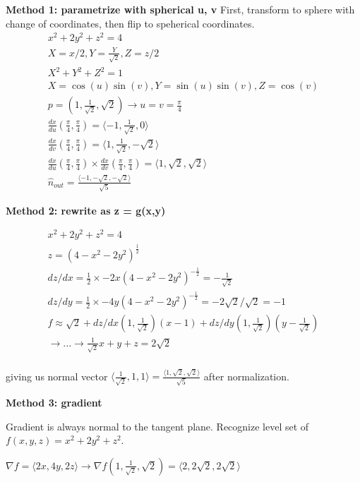 \documentclass[11pt, oneside]{article}   	%
\begin{document}
\textbf{Method 1: parametrize with spherical u, v}
First, transform to sphere with change of coordinates, then flip to speherical coordinates.
\begin{align}
x^2 + 2y^2 + z^2 = 4 \\
X = x/2, Y=\frac{Y}{\sqrt{2}}, Z = z/2 \\
X^2 + Y^2 + Z^2 = 1 \\
X = \cos(u)\sin(v), Y = \sin(u)\sin(v), Z = \cos(v) \\
p = (1, \frac{1}{\sqrt{2}}, \sqrt{2})  \rightarrow u = v = \frac{\pi}{4} \\
\frac{dx}{du}(\frac{\pi}{4}, \frac{\pi}{4}) = \langle -1, \frac{1}{\sqrt{2}}, 0 \rangle \\
\frac{dx}{dv}(\frac{\pi}{4}, \frac{\pi}{4}) = \langle 1, \frac{1}{\sqrt{2}}, -\sqrt{2} \rangle \\
\frac{dx}{du}(\frac{\pi}{4}, \frac{\pi}{4}) \times \frac{dx}{dv}(\frac{\pi}{4}, \frac{\pi}{4}) = \langle 1, \sqrt{2}, \sqrt{2}\rangle \\
\hat{n}_{out} = \frac{\langle -1, -\sqrt{2}, -\sqrt{2}\rangle }{\sqrt{5}}
\end{align}


\textbf{Method 2: rewrite as z = g(x,y)}

\begin{align}
x^2 + 2y^2 + z^2 = 4 \\
z = (4 - x^2 - 2y^2)^\frac{1}{2} \\
dz / dx = \frac{1}{2} \times -2x (4 - x^2 - 2y^2)^{-\frac{1}{2}} = -\frac{1}{\sqrt{2}} \\
dz / dy = \frac{1}{2} \times -4y (4 - x^2 - 2y^2)^{-\frac{1}{2}} =-2\sqrt{2}/\sqrt{2} = -1\\
f \approx \sqrt{2}  + dz / dx(1, \frac{1}{\sqrt{2}})(x - 1) + dz / dy (1,  \frac{1}{\sqrt{2}}) (y - \frac{1}{\sqrt{2}})\\
\rightarrow ... \rightarrow \frac{1}{\sqrt{2}}x + y + z = 2\sqrt{2} \\
\end{align}

giving us normal vector $\langle \frac{1}{\sqrt{2}}, 1, 1 \rangle = \frac{\langle 1, \sqrt{2}, \sqrt{2}\rangle }{\sqrt{5}}$
after normalization.

\textbf{Method 3: gradient}

Gradient is always normal to the tangent plane.
Recognize level set of $f(x,y,z) = x^2 + 2y^2 + z^2$.  

$\nabla f = \langle 2x, 4y, 2z \rangle \rightarrow \nabla f(1, \frac{1}{\sqrt{2}}, \sqrt{2}) = \langle 2, 2\sqrt{2}, 2\sqrt{2}\rangle$
\end{document}

